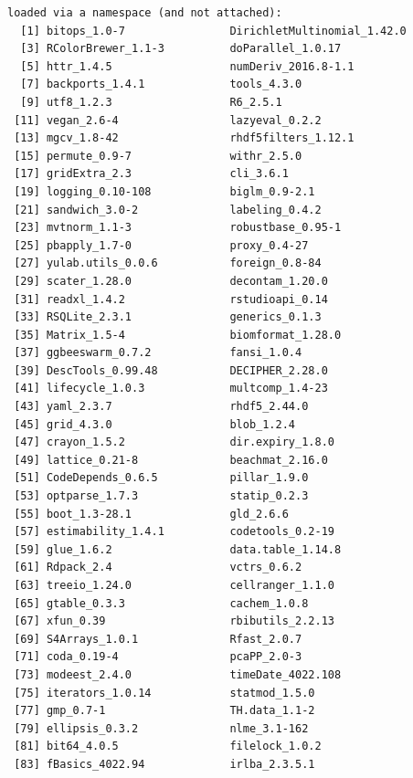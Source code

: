 \documentclass[
]{book}
\begin{document}
\begin{verbatim}
loaded via a namespace (and not attached):
  [1] bitops_1.0-7                DirichletMultinomial_1.42.0
  [3] RColorBrewer_1.1-3          doParallel_1.0.17          
  [5] httr_1.4.5                  numDeriv_2016.8-1.1        
  [7] backports_1.4.1             tools_4.3.0                
  [9] utf8_1.2.3                  R6_2.5.1                   
 [11] vegan_2.6-4                 lazyeval_0.2.2             
 [13] mgcv_1.8-42                 rhdf5filters_1.12.1        
 [15] permute_0.9-7               withr_2.5.0                
 [17] gridExtra_2.3               cli_3.6.1                  
 [19] logging_0.10-108            biglm_0.9-2.1              
 [21] sandwich_3.0-2              labeling_0.4.2             
 [23] mvtnorm_1.1-3               robustbase_0.95-1          
 [25] pbapply_1.7-0               proxy_0.4-27               
 [27] yulab.utils_0.0.6           foreign_0.8-84             
 [29] scater_1.28.0               decontam_1.20.0            
 [31] readxl_1.4.2                rstudioapi_0.14            
 [33] RSQLite_2.3.1               generics_0.1.3             
 [35] Matrix_1.5-4                biomformat_1.28.0          
 [37] ggbeeswarm_0.7.2            fansi_1.0.4                
 [39] DescTools_0.99.48           DECIPHER_2.28.0            
 [41] lifecycle_1.0.3             multcomp_1.4-23            
 [43] yaml_2.3.7                  rhdf5_2.44.0               
 [45] grid_4.3.0                  blob_1.2.4                 
 [47] crayon_1.5.2                dir.expiry_1.8.0           
 [49] lattice_0.21-8              beachmat_2.16.0            
 [51] CodeDepends_0.6.5           pillar_1.9.0               
 [53] optparse_1.7.3              statip_0.2.3               
 [55] boot_1.3-28.1               gld_2.6.6                  
 [57] estimability_1.4.1          codetools_0.2-19           
 [59] glue_1.6.2                  data.table_1.14.8          
 [61] Rdpack_2.4                  vctrs_0.6.2                
 [63] treeio_1.24.0               cellranger_1.1.0           
 [65] gtable_0.3.3                cachem_1.0.8               
 [67] xfun_0.39                   rbibutils_2.2.13           
 [69] S4Arrays_1.0.1              Rfast_2.0.7                
 [71] coda_0.19-4                 pcaPP_2.0-3                
 [73] modeest_2.4.0               timeDate_4022.108          
 [75] iterators_1.0.14            statmod_1.5.0              
 [77] gmp_0.7-1                   TH.data_1.1-2              
 [79] ellipsis_0.3.2              nlme_3.1-162               
 [81] bit64_4.0.5                 filelock_1.0.2             
 [83] fBasics_4022.94             irlba_2.3.5.1              

\end{verbatim}
\end{document}
